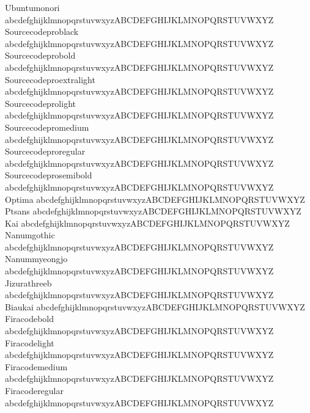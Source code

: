 \begin{tabbing}
Ubuntumonori \> {\mktsFontfileUbuntumonori{}abcdefghijklmnopqrstuvwxyzABCDEFGHIJKLMNOPQRSTUVWXYZ} \\
Sourcecodeproblack \> {\mktsFontfileSourcecodeproblack{}abcdefghijklmnopqrstuvwxyzABCDEFGHIJKLMNOPQRSTUVWXYZ} \\
Sourcecodeprobold \> {\mktsFontfileSourcecodeprobold{}abcdefghijklmnopqrstuvwxyzABCDEFGHIJKLMNOPQRSTUVWXYZ} \\
Sourcecodeproextralight \> {\mktsFontfileSourcecodeproextralight{}abcdefghijklmnopqrstuvwxyzABCDEFGHIJKLMNOPQRSTUVWXYZ} \\
Sourcecodeprolight \> {\mktsFontfileSourcecodeprolight{}abcdefghijklmnopqrstuvwxyzABCDEFGHIJKLMNOPQRSTUVWXYZ} \\
Sourcecodepromedium \> {\mktsFontfileSourcecodepromedium{}abcdefghijklmnopqrstuvwxyzABCDEFGHIJKLMNOPQRSTUVWXYZ} \\
Sourcecodeproregular \> {\mktsFontfileSourcecodeproregular{}abcdefghijklmnopqrstuvwxyzABCDEFGHIJKLMNOPQRSTUVWXYZ} \\
Sourcecodeprosemibold \> {\mktsFontfileSourcecodeprosemibold{}abcdefghijklmnopqrstuvwxyzABCDEFGHIJKLMNOPQRSTUVWXYZ} \\
Optima \> {\mktsFontfileOptima{}abcdefghijklmnopqrstuvwxyzABCDEFGHIJKLMNOPQRSTUVWXYZ} \\
Ptsans \> {\mktsFontfilePtsans{}abcdefghijklmnopqrstuvwxyzABCDEFGHIJKLMNOPQRSTUVWXYZ} \\
Kai \> {\mktsFontfileKai{}abcdefghijklmnopqrstuvwxyzABCDEFGHIJKLMNOPQRSTUVWXYZ} \\
Nanumgothic \> {\mktsFontfileNanumgothic{}abcdefghijklmnopqrstuvwxyzABCDEFGHIJKLMNOPQRSTUVWXYZ} \\
Nanummyeongjo \> {\mktsFontfileNanummyeongjo{}abcdefghijklmnopqrstuvwxyzABCDEFGHIJKLMNOPQRSTUVWXYZ} \\
Jizurathreeb \> {\mktsFontfileJizurathreeb{}abcdefghijklmnopqrstuvwxyzABCDEFGHIJKLMNOPQRSTUVWXYZ} \\
Biaukai \> {\mktsFontfileBiaukai{}abcdefghijklmnopqrstuvwxyzABCDEFGHIJKLMNOPQRSTUVWXYZ} \\
Firacodebold \> {\mktsFontfileFiracodebold{}abcdefghijklmnopqrstuvwxyzABCDEFGHIJKLMNOPQRSTUVWXYZ} \\
Firacodelight \> {\mktsFontfileFiracodelight{}abcdefghijklmnopqrstuvwxyzABCDEFGHIJKLMNOPQRSTUVWXYZ} \\
Firacodemedium \> {\mktsFontfileFiracodemedium{}abcdefghijklmnopqrstuvwxyzABCDEFGHIJKLMNOPQRSTUVWXYZ} \\
Firacoderegular \> {\mktsFontfileFiracoderegular{}abcdefghijklmnopqrstuvwxyzABCDEFGHIJKLMNOPQRSTUVWXYZ} \\

\end{tabbing}
